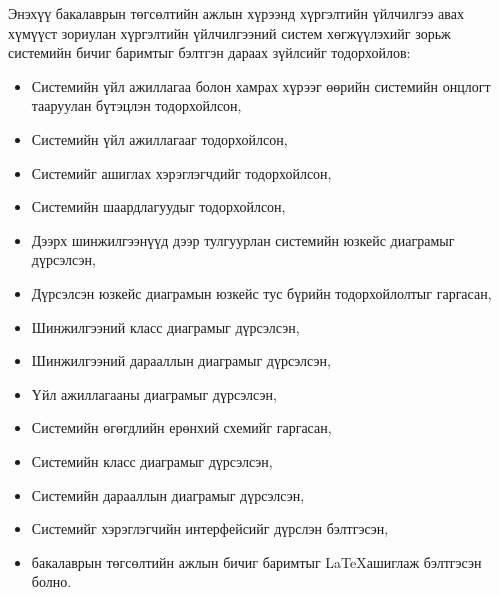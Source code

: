 
\begin{conclusion}
\addchaptertocentry{\conclusionname}

Энэхүү бакалаврын төгсөлтийн ажлын хүрээнд хүргэлтийн үйлчилгээ авах хүмүүст зориулан хүргэлтийн үйлчилгээний систем хөгжүүлэхийг зорьж системийн бичиг баримтыг бэлтгэн дараах зүйлсийг тодорхойлов:
\begin{itemize}[label={--},nosep]
	\item Системийн үйл ажиллагаа болон хамрах хүрээг өөрийн системийн онцлогт тааруулан бүтэцлэн тодорхойлсон,
    \item Системийн үйл ажиллагааг тодорхойлсон,
    \item Системийг ашиглах хэрэглэгчдийг тодорхойлсон,
    \item Системийн шаардлагуудыг тодорхойлсон,
	\item Дээрх шинжилгээнүүд дээр тулгуурлан системийн юзкейс диаграмыг дүрсэлсэн,
	\item Дүрсэлсэн юзкейс диаграмын юзкейс тус бүрийн тодорхойлолтыг гаргасан,
    \item Шинжилгээний класс диаграмыг дүрсэлсэн,
    \item Шинжилгээний дарааллын диаграмыг дүрсэлсэн,
    \item Үйл ажиллагааны диаграмыг дүрсэлсэн,
    \item Системийн өгөгдлийн ерөнхий схемийг гаргасан,
    \item Системийн класс диаграмыг дүрсэлсэн,
    \item Системийн дарааллын диаграмыг дүрсэлсэн,
    \item Системийг хэрэглэгчийн интерфейсийг дүрслэн бэлтгэсэн,
    \item бакалаврын төгсөлтийн ажлын бичиг баримтыг \LaTeX  ашиглаж бэлтгэсэн болно.
\end{itemize}

\end{conclusion}
